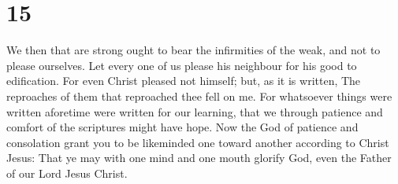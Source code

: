 \hypertarget{section-14}{%
\section{15}\label{section-14}}

 We then that are strong ought to bear the infirmities of
the weak, and not to please ourselves.  Let every one of us
please his neighbour for his good to edification.  For even
Christ pleased not himself; but, as it is written, The reproaches of
them that reproached thee fell on me.  For whatsoever things
were written aforetime were written for our learning, that we through
patience and comfort of the scriptures might have hope.  Now
the God of patience and consolation grant you to be likeminded one
toward another according to Christ Jesus:  That ye may with
one mind and one mouth glorify God, even the Father of our Lord Jesus
Christ.

